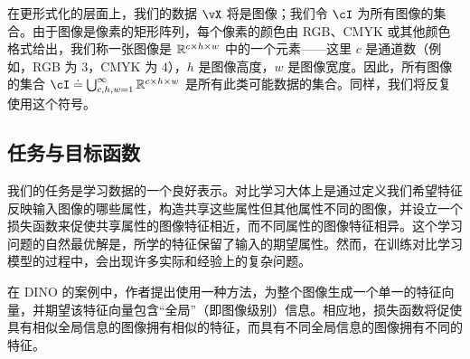 \documentclass[../../book-main.tex]{subfiles}
\begin{document}
在更形式化的层面上，我们的数据 \(\vX\) 将是图像；我们令 \(\cI\) 为所有图像的集合。由于图像是像素的矩形阵列，每个像素的颜色由 RGB、CMYK 或其他颜色格式给出，我们称一张图像是 \(\mathbb{R}^{c \times h \times w}\) 中的一个元素——这里 \(c\) 是通道数（例如，RGB 为 \(3\)，CMYK 为 \(4\)），\(h\) 是图像高度，\(w\) 是图像宽度。因此，所有图像的集合 \(\cI \doteq \bigcup_{c, h, w = 1}^{\infty}\R^{c \times h \times w}\) 是所有此类可能数据的集合。同样，我们将反复使用这个符号。


\subsection{任务与目标函数} \label{sub:contrastive_learning_objective}

我们的任务是学习数据的一个良好表示。对比学习大体上是通过定义我们希望特征反映输入图像的哪些属性，构造共享这些属性但其他属性不同的图像，并设立一个损失函数来促使共享属性的图像特征相近，而不同属性的图像特征相异。这个学习问题的自然最优解是，所学的特征保留了输入的期望属性。然而，在训练对比学习模型的过程中，会出现许多实际和经验上的复杂问题。

在 DINO 的案例中，作者提出使用一种方法，为整个图像生成一个单一的特征向量，并期望该特征向量包含“全局”（即图像级别）信息。相应地，损失函数将促使具有相似全局信息的图像拥有相似的特征，而具有不同全局信息的图像拥有不同的特征。
\end{document}
